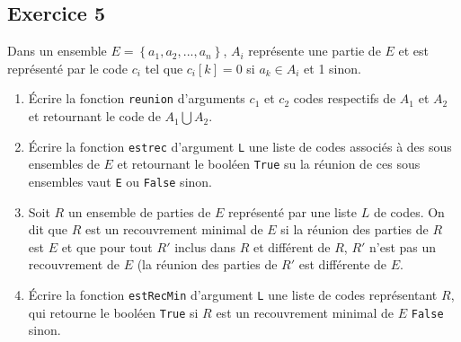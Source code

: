\documentclass[10pt,fleqn]{article} %
\begin{document}
\begin{multicols}{2}
\subsection*{Exercice 5}
Dans un ensemble $E=\left\{ a_1, a_2, ..., a_n\right\}$, $A_i$ représente une partie de  $E$ et est représenté par le code $c_i$ tel que $c_i[k]=0$ si $a_k \in A_i$ et 1 sinon.
\begin{enumerate}
\item Écrire la fonction \texttt{reunion} d'arguments $c_1$ et $c_2$ codes respectifs de $A_1$ et $A_2$ et retournant le code de $A_1 \bigcup A_2$. 
\item Écrire la fonction \texttt{estrec} d'argument \texttt{L} une liste de codes associés à des sous ensembles de $E$ et retournant le booléen \texttt{True} su la réunion de ces sous ensembles vaut \texttt{E} ou \texttt{False} sinon.
\item Soit $R$ un ensemble de parties de $E$ représenté par une liste $L$ de codes. On dit que $R$ est un recouvrement minimal de $E$ si la réunion des parties de $R$ est $E$ et que pour tout $R'$ inclus dans $R$ et différent de $R$, $R'$ n'est pas un recouvrement de $E$ (la réunion des parties de $R'$ est différente de $E$. 
\item Écrire la fonction \texttt{estRecMin} d'argument \texttt{L} une liste de codes représentant $R$, qui retourne le booléen \texttt{True} si $R$ est un recouvrement minimal de $E$ \texttt{False} sinon. 
\end{enumerate}


\end{multicols}
\end{document}
